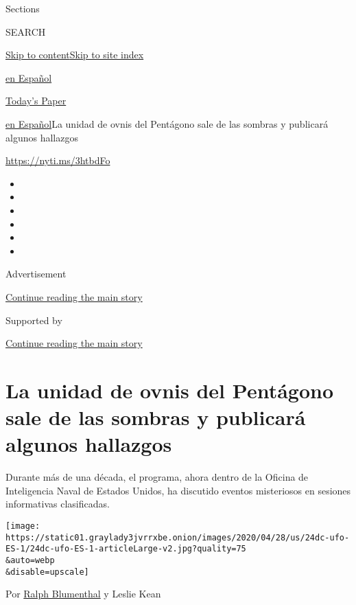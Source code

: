Sections

SEARCH

\protect\hyperlink{site-content}{Skip to
content}\protect\hyperlink{site-index}{Skip to site index}

\href{https://www.nytimes3xbfgragh.onion/es/}{en Español}

\href{https://myaccount.nytimes3xbfgragh.onion/auth/login?response_type=cookie\&client_id=vi}{}

\href{https://www.nytimes3xbfgragh.onion/section/todayspaper}{Today's
Paper}

\href{/es/}{en Español}\textbar{}La unidad de ovnis del Pentágono sale
de las sombras y publicará algunos hallazgos

\url{https://nyti.ms/3htbdFo}

\begin{itemize}
\item
\item
\item
\item
\item
\item
\end{itemize}

Advertisement

\protect\hyperlink{after-top}{Continue reading the main story}

Supported by

\protect\hyperlink{after-sponsor}{Continue reading the main story}

\hypertarget{la-unidad-de-ovnis-del-pentuxe1gono-sale-de-las-sombras-y-publicaruxe1-algunos-hallazgos}{%
\section{La unidad de ovnis del Pentágono sale de las sombras y
publicará algunos
hallazgos}\label{la-unidad-de-ovnis-del-pentuxe1gono-sale-de-las-sombras-y-publicaruxe1-algunos-hallazgos}}

Durante más de una década, el programa, ahora dentro de la Oficina de
Inteligencia Naval de Estados Unidos, ha discutido eventos misteriosos
en sesiones informativas clasificadas.

\texttt{[image: https://static01.graylady3jvrrxbe.onion/images/2020/04/28/us/24dc-ufo-ES-1/24dc-ufo-ES-1-articleLarge-v2.jpg?quality=75\\\&auto=webp\\\&disable=upscale]}

Por \href{https://www.nytimes3xbfgragh.onion/by/ralph-blumenthal}{Ralph
Blumenthal} y Leslie Kean

